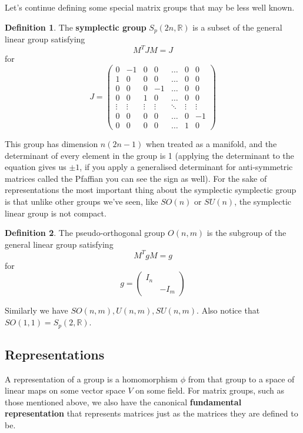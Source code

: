 \documentclass{article}
\theoremstyle{definition}
\newtheorem{definition}{Definition}
\begin{document}
Let's continue defining some special matrix groups that may be less well known.

\begin{definition}
  The \textbf{symplectic group} $S_p(2n, \mathbb{R})$ is a subset of the general
  linear group satisfying
  $$ M^T J M = J $$
  for
  $$ J =
  \begin{pmatrix}
    0 & -1 & 0 & 0 & \dots & 0 & 0 \\
    1 & 0 & 0 & 0 & \dots & 0 & 0 \\
    0 & 0 & 0 & -1 & \dots & 0 & 0 \\
    0 & 0 & 1 & 0 & \dots & 0 & 0 \\
    \vdots & \vdots & \vdots & \vdots & \ddots & \vdots & \vdots \\
    0 & 0 & 0 & 0 & \dots & 0 & -1 \\
    0 & 0 & 0 & 0 & \dots & 1 & 0
  \end{pmatrix}
  $$
\end{definition}

This group has dimension $n(2n - 1)$ when treated as a manifold, and the
determinant of every element in the group is 1 (applying the determinant to the
equation gives us $\pm1$, if you apply a generalised determinant for
anti-symmetric matrices called the Pfaffian you can see the sign as well). For
the sake of representations the most important thing about the symplectic
symplectic group is that unlike other groups we've seen, like $SO(n)$ or
$SU(n)$, the symplectic linear group is not compact.

\begin{definition}
  The pseudo-orthogonal group $O(n, m)$ is the subgroup of the general linear
  group satisfying
  $$ M^T g M = g $$
  for
  $$ g =
  \begin{pmatrix}
    I_n & \\
    & -I_m
  \end{pmatrix}
  $$
\end{definition}

Similarly we have $SO(n, m), U(n, m), SU(n, m)$. Also notice that $SO(1, 1) =
S_p(2, \mathbb{R})$.

\subsection{Representations}

A representation of a group is a homomorphism $\phi$ from that group to a space of
linear maps on some vector space $V$ on some field. For matrix groups, such as
those mentioned above, we 
also have the canonical \textbf{fundamental representation} that represents
matrices just as the matrices they are defined to be.
\end{document}
